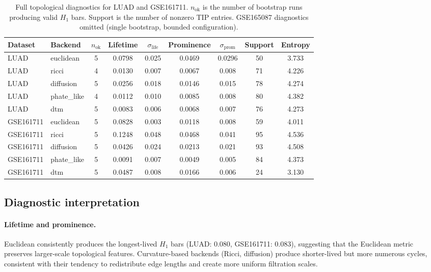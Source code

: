 \documentclass[11pt]{article}
\begin{document}
\begin{table}[h]
\centering
\small
\begin{tabular}{llccccccc}
\toprule
Dataset & Backend & $n_\text{ok}$ & Lifetime & $\sigma_\text{life}$ & Prominence & $\sigma_\text{prom}$ & Support & Entropy \\
\midrule
LUAD & euclidean & 5 & 0.0798 & 0.025 & 0.0469 & 0.0296 & 50 & 3.733 \\
LUAD & ricci & 4 & 0.0130 & 0.007 & 0.0067 & 0.008 & 71 & 4.226 \\
LUAD & diffusion & 5 & 0.0256 & 0.018 & 0.0146 & 0.015 & 78 & 4.274 \\
LUAD & phate\_like & 4 & 0.0112 & 0.010 & 0.0085 & 0.008 & 80 & 4.382 \\
LUAD & dtm & 5 & 0.0083 & 0.006 & 0.0068 & 0.007 & 76 & 4.273 \\
\midrule
GSE161711 & euclidean & 5 & 0.0828 & 0.003 & 0.0118 & 0.008 & 59 & 4.011 \\
GSE161711 & ricci & 5 & 0.1248 & 0.048 & 0.0468 & 0.041 & 95 & 4.536 \\
GSE161711 & diffusion & 5 & 0.0426 & 0.024 & 0.0213 & 0.021 & 93 & 4.508 \\
GSE161711 & phate\_like & 5 & 0.0091 & 0.007 & 0.0049 & 0.005 & 84 & 4.373 \\
GSE161711 & dtm & 5 & 0.0487 & 0.008 & 0.0166 & 0.006 & 24 & 3.130 \\
\bottomrule
\end{tabular}
\caption{Full topological diagnostics for LUAD and GSE161711.
$n_\text{ok}$ is the number of bootstrap runs producing valid $H_1$ bars.
Support is the number of nonzero TIP entries.
GSE165087 diagnostics omitted (single bootstrap, bounded configuration).}
\label{tab:diagnostics_full}
\end{table}

\subsection{Diagnostic interpretation}

\paragraph{Lifetime and prominence.}
Euclidean consistently produces the longest-lived $H_1$ bars (LUAD: 0.080, GSE161711: 0.083), suggesting that the Euclidean metric preserves larger-scale topological features.
Curvature-based backends (Ricci, diffusion) produce shorter-lived but more numerous cycles, consistent with their tendency to redistribute edge lengths and create more uniform filtration scales.
\end{document}
